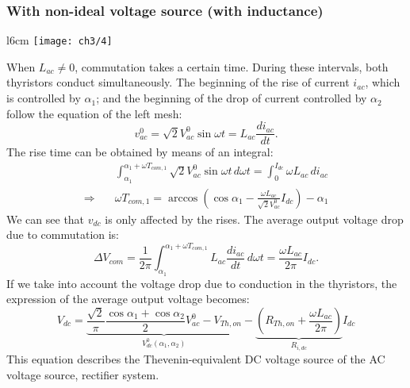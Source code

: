 			\subsubsection{With non-ideal voltage source (with inductance)}
				\begin{wrapfigure}[12]{l}{6cm}
				\vspace{-5mm}
				\texttt{[image: ch3/4]}
				\end{wrapfigure}
				When $L_{ac} \neq 0$, commutation takes a certain time. During these intervals, both thyristors conduct simultaneously. The beginning of the rise of current $i_{ac}$, which is controlled by $\alpha _1$; and the beginning of the drop of current controlled by $\alpha _2$ follow the equation of the left mesh:
				\begin{equation}
					v_{ac}^0 = \sqrt{2} V_{ac}^0 \sin \omega t = L_{ac} \frac{di_{ac}}{dt}. 
				\end{equation}
				The rise time can be obtained by means of an integral:
				\begin{equation}
				\begin{aligned}
					&\int _{\alpha _1} ^{\alpha _1 + \omega T_{com,1}} \sqrt{2} V_{ac}^0 \sin \omega t \, d\omega t = \int _0^{I_{dc}} \omega L_{ac} \, di_{ac}\\ \Rightarrow\quad &\omega T_{com,1} = \arccos \left( \cos \alpha _1 - \frac{\omega L_{ac}}{\sqrt{2}V_{ac}^0}I_{dc} \right) - \alpha _1
					\end{aligned}
				\end{equation}
				We can see that $v_{dc}$ is only affected by the rises. The average output voltage drop due to commutation is: 
				\begin{equation}
					\Delta V_{com} = \frac{1}{2\pi} \int _{\alpha _1} ^{\alpha _1 + \omega T_{com,1}} L_{ac} \frac{di_{ac}}{dt} \, d\omega t = \frac{\omega L_{ac}}{2\pi} I_{dc}. 
				\end{equation}
				If we take into account the voltage drop due to conduction in the thyristors, the expression of the average output voltage becomes:
				\begin{equation}
				V_{dc} = \underbrace{\frac{\sqrt{2}}{\pi} \frac{\cos \alpha _1 + \cos \alpha _2}{2} V_{ac}^0 - V_{Th,on}}_{V_{dc}^0(\alpha _1,\alpha _2)} - \underbrace{\left( R_{Th,on} + \frac{\omega L_{ac}}{2\pi} \right)}_{R_{i,dc}}I_{dc}
				\end{equation}
				This equation describes the Thevenin-equivalent DC voltage source of the AC voltage source, rectifier system.

